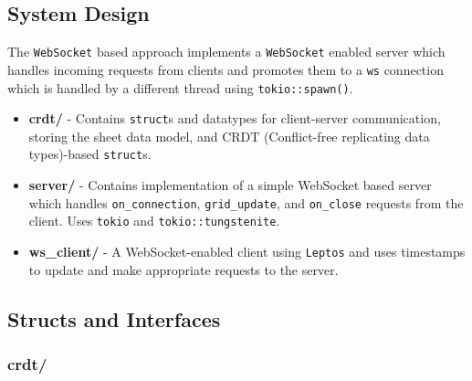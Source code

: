 
\subsection{System Design}

The \verb|WebSocket| based approach implements a \verb|WebSocket| enabled server which handles incoming requests from clients and promotes them to a \verb|ws| connection which is handled by a different thread using \verb|tokio::spawn()|. 

\begin{itemize}
    \item \textbf{crdt/} - Contains \verb|struct|s and datatypes for client-server communication, storing the sheet data model, and CRDT (Conflict-free replicating data types)-based \verb|struct|s.
    \item \textbf{server/} - Contains implementation of a simple WebSocket based server which handles \verb|on_connection|, \verb|grid_update|, and \verb|on_close| requests from the client. Uses \verb|tokio| and \verb|tokio::tungstenite|.
    \item \textbf{ws\_client/} - A WebSocket-enabled client using \verb|Leptos| and uses timestamps to update and make appropriate requests to the server.
\end{itemize}

\subsection{Structs and Interfaces}

\subsubsection{\textbf{crdt/}}

